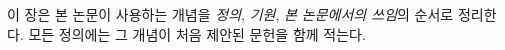 
이 장은 본 논문이 사용하는 개념을 \emph{정의}, \emph{기원}, \emph{본 논문에서의 쓰임}의 순서로 정리한다. 모든 정의에는 그 개념이 처음 제안된 문헌을 함께 적는다.
